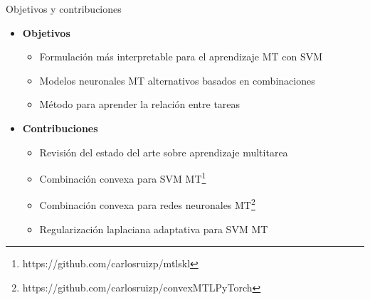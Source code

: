 \documentclass[aspectratio=43,spanish]{beamer}
\newcommand{\norm}[1]{\left\lVert#1\right\rVert}
\newcommand{\myvec}[1]{\bm{#1}}
\newcommand{\fv}[1]{\myvec{#1}}
\newcommand{\dotp}[2]{\bm{\left\langle} #1, #2 \bm{\right\rangle}}
\begin{document}
\begin{frame}{Objetivos y contribuciones}

\begin{itemize}
      \item \textbf{Objetivos}
      \begin{itemize}
            \item %
            Formulación más interpretable para el aprendizaje MT con SVM
            \item %
            Modelos neuronales MT alternativos basados en combinaciones
            \item %
            Método para aprender la relación entre tareas %
            
      \end{itemize}
      \item \textbf{Contribuciones}
      \begin{itemize}
            \item Revisión del estado del arte sobre aprendizaje multitarea
            \item Combinación convexa para SVM MT\footnote{\label{mtlskl}https://github.com/carlosruizp/mtlskl}
            \item Combinación convexa para redes neuronales MT\footnote{\label{mtlskl}https://github.com/carlosruizp/convexMTLPyTorch}
            \item Regularización laplaciana adaptativa para SVM MT
      \end{itemize}
\end{itemize}

      
\end{frame}


\end{document}
